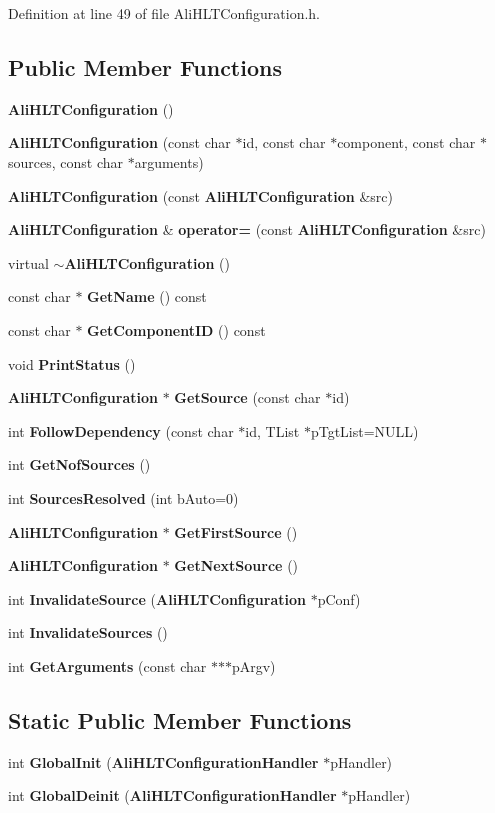 Definition at line 49 of file Ali\-HLTConfiguration.h.\subsection*{Public Member Functions}
\begin{CompactItemize}
\item 
{\bf Ali\-HLTConfiguration} ()
\item 
{\bf Ali\-HLTConfiguration} (const char $\ast$id, const char $\ast$component, const char $\ast$sources, const char $\ast$arguments)
\item 
{\bf Ali\-HLTConfiguration} (const {\bf Ali\-HLTConfiguration} \&src)
\item 
{\bf Ali\-HLTConfiguration} \& {\bf operator=} (const {\bf Ali\-HLTConfiguration} \&src)
\item 
virtual {\bf $\sim$Ali\-HLTConfiguration} ()
\item 
const char $\ast$ {\bf Get\-Name} () const 
\item 
const char $\ast$ {\bf Get\-Component\-ID} () const 
\item 
void {\bf Print\-Status} ()
\item 
{\bf Ali\-HLTConfiguration} $\ast$ {\bf Get\-Source} (const char $\ast$id)
\item 
int {\bf Follow\-Dependency} (const char $\ast$id, TList $\ast$p\-Tgt\-List=NULL)
\item 
int {\bf Get\-Nof\-Sources} ()
\item 
int {\bf Sources\-Resolved} (int b\-Auto=0)
\item 
{\bf Ali\-HLTConfiguration} $\ast$ {\bf Get\-First\-Source} ()
\item 
{\bf Ali\-HLTConfiguration} $\ast$ {\bf Get\-Next\-Source} ()
\item 
int {\bf Invalidate\-Source} ({\bf Ali\-HLTConfiguration} $\ast$p\-Conf)
\item 
int {\bf Invalidate\-Sources} ()
\item 
int {\bf Get\-Arguments} (const char $\ast$$\ast$$\ast$p\-Argv)
\end{CompactItemize}
\subsection*{Static Public Member Functions}
\begin{CompactItemize}
\item 
int {\bf Global\-Init} ({\bf Ali\-HLTConfiguration\-Handler} $\ast$p\-Handler)
\item 
int {\bf Global\-Deinit} ({\bf Ali\-HLTConfiguration\-Handler} $\ast$p\-Handler)
\end{CompactItemize}
